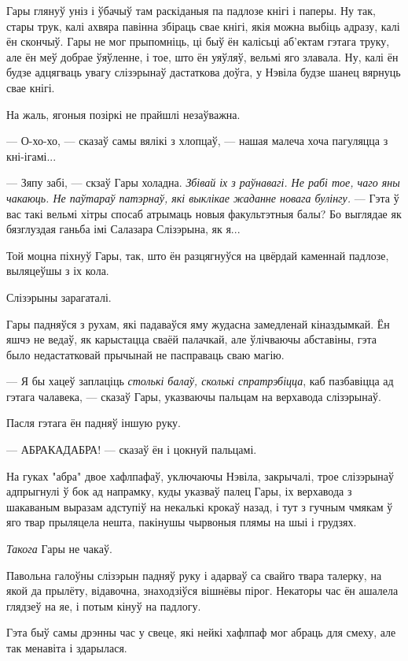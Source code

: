 Гары глянуў уніз і ўбачыў там раскіданыя па падлозе кнігі і паперы. Ну так, 
стары трук, калі ахвяра павінна збіраць свае кнігі, якія можна выбіць адразу, калі ён
скончыў. Гары не мог прыпомніць, ці быў ён калісьці аб'ектам гэтага труку, але 
ён меў добрае ўяўленне, і тое, што ён уяўляў, вельмі яго злавала. Ну, калі ён будзе 
адцягваць увагу слізэрынаў дастаткова доўга, у Нэвіла будзе шанец вярнуць свае кнігі.

На жаль, ягоныя позіркі не прайшлі незаўважна.

--- О-хо-хо, --- сказаў самы вялікі з хлопцаў, --- нашая малеча хоча пагуляцца з 
кні-ігамі...

--- Зяпу забі, --- скзаў Гары холадна. \emph{Збівай іх з раўнавагі.
Не рабі тое, чаго яны чакаюць. Не паўтараў патэрнаў, які выклікае жаданне
новага булінгу.} --- Гэта ў вас такі вельмі хітры спосаб атрымаць новыя факультэтныя балы?
Бо выглядае як 
бязглуздая ганьба імі Салазара Слізэрына, як я...

Той моцна піхнуў Гары, так, што ён разцягнуўся на цвёрдай каменнай
падлозе, выляцеўшы з іх кола.  

Слізэрыны зарагаталі.

Гары падняўся з рухам, які падаваўся яму жудасна замедленай кіназдымкай. 
Ён яшчэ не ведаў, як карыстацца сваёй палачкай, але ўлічваючы абставіны,
гэта было недастатковай прычынай не пасправаць сваю магію.

--- Я бы хацеў заплаціць \emph{столькі балаў, сколькі спратрэбіцца}, каб 
пазбавіцца ад гэтага чалавека, --- сказаў Гары, указваючы пальцам на верхавода 
слізэрынаў.

Пасля гэтага ён падняў іншую руку.

--- АБРАКАДАБРА! --- сказаў ён і цокнуй пальцамі.

На гуках "абра" двое хафлпафаў, уключаючы Нэвіла, закрычалі, трое слізэрынаў 
адпрыгнулі ў бок ад напрамку, куды указваў палец Гары, іх верхавода з шакаваным 
выразам адступіў на некалькі крокаў назад, і тут з гучным чмякам ў яго твар прыляцела нешта,
пакінушы чырвоныя плямы на шыі і грудзях. 

\emph{Такога} Гары не чакаў.

Павольна галоўны слізэрын падняў руку і адарваў са свайго твара талерку, на якой
да прылёту, відавочна, знаходзіўся вішнёвы пірог. Некаторы час ён ашалела глядзеў на яе,
і потым кінуў на падлогу.

Гэта быў самы дрэнны час у свеце, які нейкі хафлпаф мог абраць для смеху, але так 
менавіта і здарылася.  

